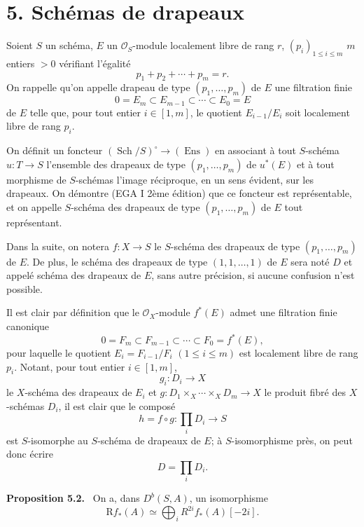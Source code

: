 \documentclass[11pt]{article}
\newenvironment{statement}[1]{\par\medskip\noindent\textbf{#1.}\ }{\par\medskip}
\begin{document}
\section*{5. Schémas de drapeaux}

Soient $S$ un schéma, $E$ un $\mathcal O_S$-module localement libre de rang $r$, $(p_i)_{1\le i\le m}$ $m$ entiers $>0$ vérifiant l'égalité
\[
p_1+p_2+\cdots+p_m=r.
\]
On rappelle qu'on appelle drapeau de type $(p_1,\ldots,p_m)$ de $E$ une filtration finie
\[
0=E_m\subset E_{m-1}\subset\cdots\subset E_0=E
\]
de $E$ telle que, pour tout entier $i\in[1,m]$, le quotient $E_{i-1}/E_i$ soit localement libre de rang $p_i$.

On définit un foncteur $(\operatorname{Sch}/S)^\circ\to(\operatorname{Ens})$ en associant à tout $S$-schéma $u:T\to S$ l'ensemble des drapeaux de type $(p_1,\ldots,p_m)$ de $u^*(E)$ et à tout morphisme de $S$-schémas l'image réciproque, en un sens évident, sur les drapeaux. On démontre (EGA I 2ème édition) que ce foncteur est représentable, et on appelle $S$-schéma des drapeaux de type $(p_1,\ldots,p_m)$ de $E$ tout représentant.

Dans la suite, on notera $f:X\to S$ le $S$-schéma des drapeaux de type $(p_1,\ldots,p_m)$ de $E$. De plus, le schéma des drapeaux de type $(1,1,\ldots,1)$ de $E$ sera noté $D$ et appelé schéma des drapeaux de $E$, sans autre précision, si aucune confusion n'est possible.

Il est clair par définition que le $\mathcal O_X$-module $f^*(E)$ admet une filtration finie canonique
\[
0=F_m\subset F_{m-1}\subset\cdots\subset F_0=f^*(E),
\]
pour laquelle le quotient $E_i=F_{i-1}/F_i$ $(1\le i\le m)$ est localement libre de rang $p_i$. Notant, pour tout entier $i\in[1,m]$,
\[
g_i:D_i\to X
\]
le $X$-schéma des drapeaux de $E_i$ et $g:D_1\times_X\cdots\times_X D_m\to X$ le produit fibré des $X$-schémas $D_i$, il est clair que le composé
\[
h=f\circ g:\prod_iD_i\to S
\tag{5.1}
\]
est $S$-isomorphe au $S$-schéma de drapeaux de $E$; à $S$-isomorphisme près, on peut donc écrire
\[
D=\prod_iD_i.
\]

\begin{statement}{Proposition 5.2}
On a, dans $D^b(S,A)$, un isomorphisme
\[
\mathrm Rf_*(A)\simeq\bigoplus_i R^{2i}f_*(A)[-2i].
\]
\end{statement}
\end{document}

